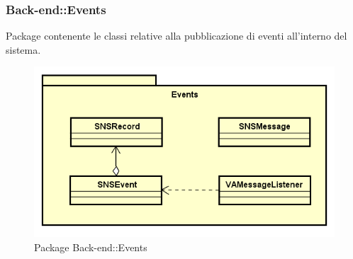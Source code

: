\subsubsection{Back-end::Events}
Package contenente le classi relative alla pubblicazione di eventi all'interno del sistema.
\begin{figure}[h] \centering 
\includegraphics[width=\textwidth,height=\textheight,keepaspectratio]{images/diagrams/back-end/Official_Backend_0304/Events.png}
\caption{Package Back-end::Events}
\end{figure}
\newpage

